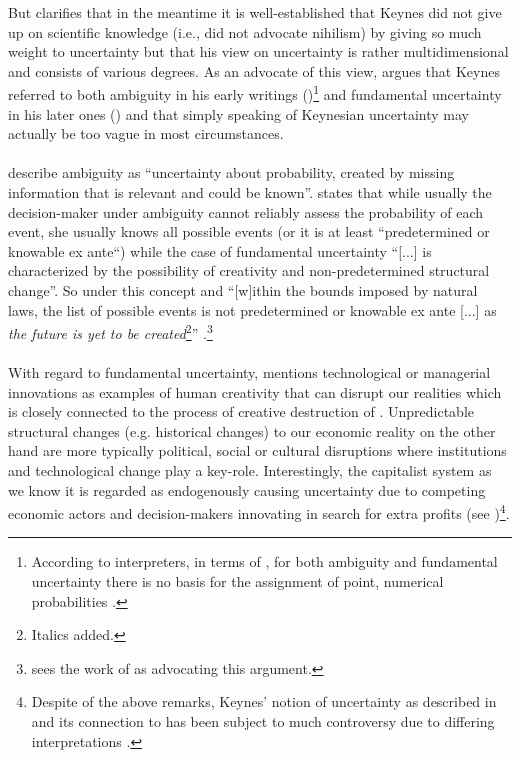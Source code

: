 \documentclass[a4paper,11pt,listof=nochaptergap,oneside,pointednumbers,bibtotoc,bigheadings,liststotoc]{scrbook}
\begin{document}
But \citet{dow:16} clarifies that in the meantime it is well-established that Keynes did not give up on scientific knowledge (i.e., did not advocate nihilism) by giving so much weight to uncertainty but that his view on uncertainty is rather multidimensional and consists of various degrees. As an advocate of this view, \citet{dequesh:00} argues that Keynes referred to both ambiguity in his early writings (\citealp{keynes:21})\footnote{According to interpreters, in terms of \citet{keynes:21}, for both ambiguity and fundamental uncertainty there is no basis for the assignment of point, numerical probabilities \citep{dequesh:00}.} and fundamental uncertainty in his later ones (\citealp{keynes:37}) and that simply speaking of Keynesian uncertainty may actually be too vague in most circumstances. \\
\\
\citet[p. 330]{camererandweber:92} describe ambiguity as ``uncertainty about probability, created by missing information that is relevant and could be known''. \citet[p. 623]{dequech:14} states that while usually the decision-maker under ambiguity cannot reliably assess the probability of each event, she usually knows all possible events (or it is at least ``predetermined or knowable ex ante``) while the case of fundamental uncertainty ``[...] is characterized by the possibility of creativity and non-predetermined structural change''. So under this concept and ``[w]ithin the bounds imposed by natural laws, the list of possible events is not predetermined or knowable ex ante [...] as \textit{the future is yet to be created}\footnote{Italics added.}'' \citep[p. 623]{dequech:14}.\footnote{\citet{dequesh:00} sees the work of \citet{shackle:72} as advocating this argument.}\\
\\
With regard to fundamental uncertainty, \citet{dequesh:00} mentions technological or managerial innovations as examples of human creativity that can disrupt our realities which is closely connected to the process of creative destruction of \citet{schumpeter:42}. Unpredictable structural changes (e.g. historical changes) to our economic reality on the other hand are more typically political, social or cultural disruptions where institutions and technological change play a key-role. Interestingly, the capitalist system as we know it is regarded as endogenously causing uncertainty due to competing economic actors and decision-makers innovating in search for extra profits (see \citealp{kregel:87})\footnote{Despite of the above remarks, Keynes' notion of uncertainty as described in \citet{keynes:21} and its connection to \citet{keynes:37} has been subject to much controversy due to differing interpretations \citep{dequesh:00}.}.\\
\end{document}
